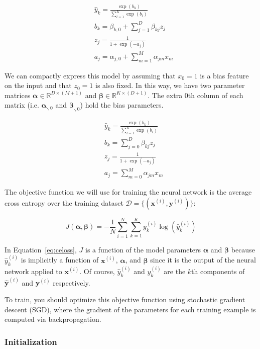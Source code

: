 \documentclass[11pt]{article}
\numberwithin{equation}{section} %
\numberwithin{figure}{section} %
\numberwithin{table}{section} %
\newcommand{\Dc}{\mathcal{D}}
\newcommand{\Rb}{\mathbb{R}}
\newcommand{\xv}{\mathbf{x}}
\newcommand{\yv}{\mathbf{y}}
\newcommand{\alphav     }{\boldsymbol \alpha     }
\newcommand{\betav      }{\boldsymbol \beta      }
\begin{document}
\begin{align*}
&  \hat{y}_k = \frac{\exp(b_k)}{\sum_{l=1}^K \exp(b_l)}
\\
& b_k =  \beta_{k,0} + \sum_{j=1}^D \beta_{kj} z_j
\\
& z_j = \frac{1}{1+\exp(-a_j)}
\\
& a_j = \alpha_{j,0} + \sum_{m=1}^M \alpha_{jm} x_m
\end{align*}

We can compactly express this model by assuming that $x_0=1$ is a bias feature on the input and that $z_0=1$ is also fixed. In this way, we have two parameter matrices $\alphav \in \Rb^{D \times (M+1)}$ and $\betav \in \Rb^{K \times (D+1)}$. The extra $0$th column of each matrix (i.e. $\alphav_{\cdot,0}$ and $\betav_{\cdot,0}$) hold the bias parameters.

\begin{align*}
&  \hat{y}_k = \frac{\exp(b_k)}{\sum_{l=1}^K \exp(b_l)}
\\
& b_k =  \sum_{j=0}^D \beta_{kj} z_j
\\
& z_j = \frac{1}{1+\exp(-a_j)}
\\
& a_j = \sum_{m=0}^M \alpha_{jm} x_m
\end{align*}

The objective function we will use for training the neural network is the average cross entropy over the training dataset $\Dc = \{ (\xv^{(i)}, \yv^{(i)}) \}$:

\begin{equation}
\label{eq:celoss}
J(\alphav, \betav)= - \frac{1}{N} \sum_{i=1}^N \sum_{k=1}^{K} y_k^{(i)} \log (\hat{y}^{(i)}_k)
\end{equation}

In Equation~\ref{eq:celoss}, $J$ is a function of the model parameters $\alphav$ and $\betav$ because $\hat{y}^{(i)}_k$ is implicitly a function of $\xv^{(i)}$, $\alphav$, and $\betav$ since it is the output of the neural network applied to $\xv^{(i)}$. Of course, $\hat{y}^{(i)}_k$ and $y_k^{(i)}$ are the $k$th components of $\hat{\yv}^{(i)}$ and $\yv^{(i)}$ respectively.


To train, you should optimize this objective function using stochastic gradient descent (SGD), where the gradient of the parameters for each training example is computed via backpropagation.

\subsubsection{Initialization}
\label{sec:init}
\end{document}
